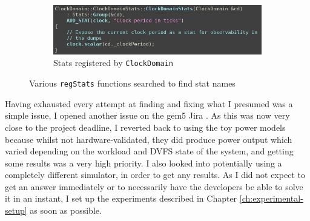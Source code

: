 \begin{figure}[H]
\begin{minipage}[b]{0.45\textwidth}
\begin{subfigure}[b]{\linewidth}
            \centering
            \includegraphics[width=\textwidth]{screenshots/have-to-search-src-for-regStats/clock-domain-registers-a-stat.png}
            \caption{Stats registered by \texttt{ClockDomain}}
            \label{subfig:clk-dom-regStats}
        \end{subfigure}
    \end{minipage}
    \caption{Various \texttt{regStats} functions searched to find stat 
        names}
    \label{fig:regstats-search}
\end{figure}

Having exhausted every attempt at finding and fixing what I presumed was a 
simple issue, I opened another issue on the gem5 Jira 
\cite{hansen_gem5-463_2020}. As this was now very close to the project 
deadline, I reverted back to using the toy power models because whilst not 
hardware-validated, they did produce power output which varied depending on 
the workload and DVFS state of the system, and getting some results was a 
very high priority. I also looked into potentially using a completely 
different simulator, in order to get any results. As I did not expect to 
get an answer immediately or to necessarily have the developers be able to 
solve it in an instant, I set up the experiments described in Chapter 
\ref{ch:experimental-setup} as soon as possible.

